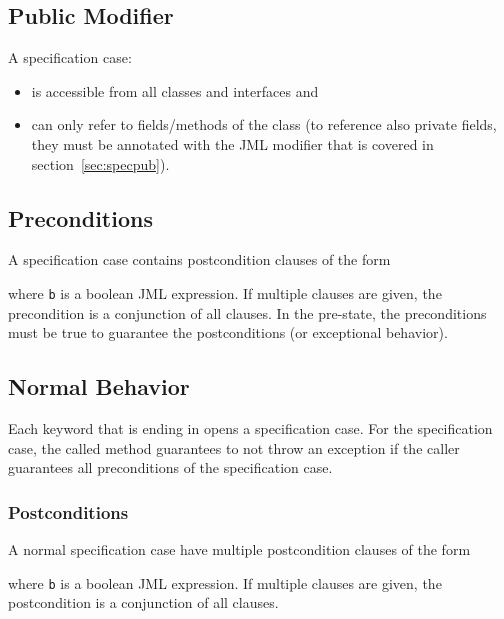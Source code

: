 		\subsection{Public Modifier}
			A  specification case:
			\begin{itemize}
				\item is accessible from all classes and interfaces and
				\item can only refer to  fields/methods of the class (to reference also private fields, they must be annotated with the JML modifier  that is covered in section~\ref{sec:specpub}).
			\end{itemize}

		\subsection{Preconditions}
			\label{sec:precond}

			A specification case contains postcondition clauses of the form
			\begin{center}
			\end{center}
			where \texttt{b} is a boolean JML expression. If multiple clauses are given, the precondition is a conjunction of all clauses. In the pre-state, the preconditions must be true to guarantee the postconditions (or exceptional behavior).

		\subsection{Normal Behavior}
			Each keyword that is ending in  opens a specification case. For the  specification case, the called method guarantees to not throw an exception if the caller guarantees all preconditions of the specification case.

			\subsubsection{Postconditions}
				\label{sec:postcond1}

				A normal specification case have multiple postcondition clauses of the form
				\begin{center}
				\end{center}
				where \texttt{b} is a boolean JML expression. If multiple clauses are given, the postcondition is a conjunction of all clauses.

